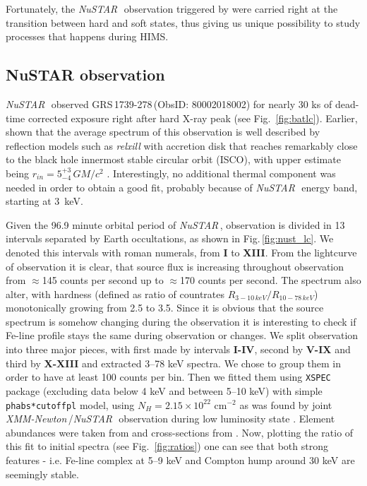 \documentclass[a4paper,fleqn,usenatbib]{mnras}
\def\grs{{GRS\,1739-278\,}}
\def\xmm{{\em XMM-Newton\,}}
\def\nustar{{\em NuSTAR\,}}
\begin{document}
Fortunately, the \nustar\, \citep{harrison13_nust} observation triggered by \cite{miller15_nust} were carried right at the transition between hard and soft states, thus giving us unique possibility to study processes that happens during HIMS. 

\subsection{NuSTAR observation}
\label{sec:nust} 

\nustar\, observed \grs (ObsID: 80002018002) for nearly 30 ks of dead-time corrected exposure right after hard X-ray peak (see Fig.~\ref{fig:batlc}). Earlier, \cite{miller15_nust} shown that the average spectrum of this observation is well described by reflection models such as {\it relxill} \citep{garcia14, dauser14,dauser16} with accretion disk that reaches remarkably close to the black hole innermost stable circular orbit (ISCO), with upper estimate being $r_{in} = 5^{+3}_{-4}\, G M/c^{2}$ \citep{miller15_nust}. Interestingly, no additional thermal component was needed in order to obtain a good fit, probably because of \nustar\, energy band, starting at 3~keV. 

Given the 96.9 minute orbital period of \nustar, observation is divided in 13 intervals separated by Earth occultations, as shown in Fig.\,\ref{fig:nust_lc}. We denoted this intervals with roman numerals, from {\bf I} to {\bf XIII}. From the lightcurve of observation it is clear, that source flux is increasing throughout observation from $\approx$145 counts per second up to $\approx$170 counts per second. 
The spectrum also alter, with hardness (defined as ratio of countrates  $R_{3-10\,keV}/R_{10-78\,keV}$) monotonically growing from 2.5 to 3.5. 
Since it is obvious that the source spectrum is somehow changing during the observation it is interesting to check if Fe-line profile stays the same during observation or changes. 
We split observation into three major pieces, with first made by intervals {\bf I-IV}, second by {\bf V-IX} and third by {\bf X-XIII} and extracted 3--78 keV spectra. 
We chose to group them in order to have at least 100 counts per bin. 
Then we fitted them using \texttt{XSPEC} package \citep{arnaud96} (excluding data below 4 keV and between 5--10 keV) with simple \texttt{phabs*cutoffpl} model, using $N_{H} = 2.15\times10^{22}$ cm$^{-2}$ as was found by joint \xmm/\nustar\, observation during low luminosity state \citep{fuerst16}. Element abundances were taken from \cite{wilms00} and cross-sections from \cite{verner96}. Now, plotting the ratio of this fit to initial spectra (see Fig.~\ref{fig:ratios}) one can see that both strong features - i.e. Fe-line complex at 5--9 keV and Compton hump around 30 keV are seemingly stable. 
\end{document}
